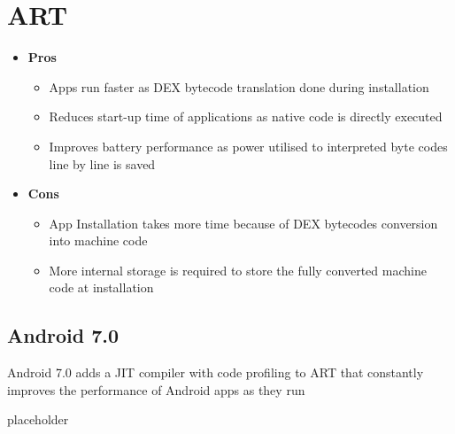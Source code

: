 \documentclass{article}
\begin{document}
\pagebreak

\section{ART}

\begin{itemize}
  \item \textbf{Pros}
  \begin{itemize}
    \item Apps run faster as DEX bytecode translation done during installation
    \item Reduces start-up time of applications as native code is directly executed
    \item Improves battery performance as power utilised to interpreted byte codes line by line is saved
  \end{itemize}
  \item \textbf{Cons}
  \begin{itemize}
    \item App Installation takes more time because of DEX bytecodes conversion into machine code
    \item More internal storage is required to store the fully converted machine code at installation
  \end{itemize}
\end{itemize}

\subsection{Android 7.0}
\begin{flushleft}
Android 7.0 adds a JIT compiler with code profiling to ART that constantly improves the performance of Android apps as they run
\end{flushleft}

\newpage

\begin{description}
	\item[placeholder] \hfill \\
\end{description}
\end{document}
